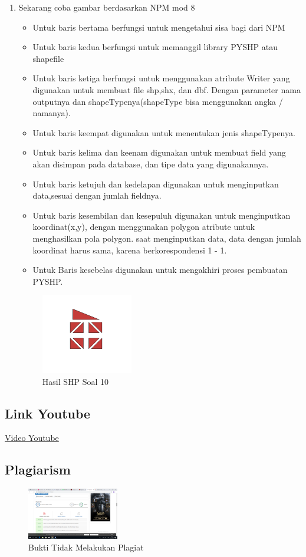 \begin{enumerate}
	\item Sekarang coba gambar berdasarkan NPM mod 8
	
	\begin{itemize}
		\item Untuk baris bertama berfungsi untuk mengetahui sisa bagi dari NPM
		\item Untuk baris kedua berfungsi untuk memanggil library PYSHP atau shapefile
		\item Untuk baris ketiga berfungsi untuk menggunakan atribute Writer yang digunakan untuk membuat file shp,shx, dan dbf. \hfill\break Dengan parameter nama outputnya dan shapeTypenya(shapeType bisa menggunakan angka / namanya).
		\item Untuk baris keempat digunakan untuk menentukan jenis shapeTypenya.
		\item Untuk baris kelima dan keenam digunakan untuk membuat field yang akan disimpan pada database, dan tipe data yang digunakannya.
		\item Untuk baris ketujuh dan kedelapan digunakan untuk menginputkan data,sesuai dengan jumlah fieldnya.
		\item Untuk baris kesembilan dan kesepuluh digunakan untuk menginputkan koordinat(x,y), dengan menggunakan polygon atribute untuk menghasilkan pola polygon. \hfill\break
		saat menginputkan data, data dengan jumlah koordinat harus sama, karena berkorespondensi 1 - 1.
		\item Untuk Baris kesebelas digunakan untuk mengakhiri proses pembuatan PYSHP.
	\end{itemize}
	\hfill\break
	\begin{figure}[H]
		\includegraphics[width=4cm]{figures/1174095/2/10.png}
		\centering
		\caption{Hasil SHP Soal 10}
	\end{figure}
\end{enumerate}
\subsection{Link Youtube}
\href{https://youtu.be/f_FwEtMZY1c}{Video Youtube}
\subsection{Plagiarism}
\begin{figure}[H]
	\includegraphics[width=4cm]{figures/1174095/2/plag.png}
	\centering
	\caption{Bukti Tidak Melakukan Plagiat}
\end{figure}